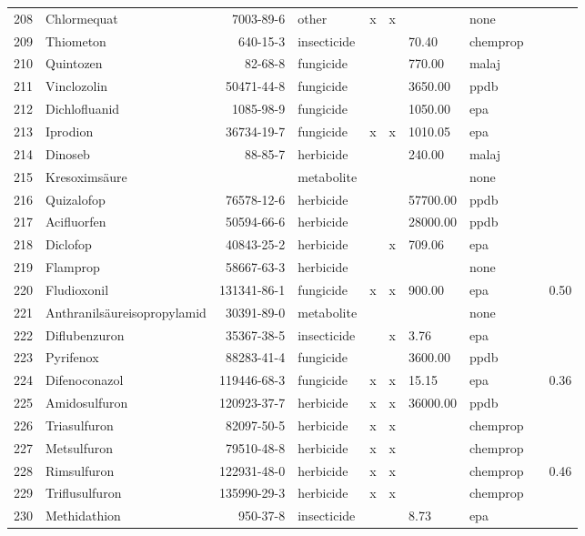 \begin{longtable}{lp{3cm}rlp{0.5cm}p{0.5cm}p{1.5cm}p{1cm}p{1cm}p{1cm}}
  208 & Chlormequat & 7003-89-6 & other & x & x &  & none &  &  \\ 
  209 & Thiometon & 640-15-3 & insecticide &  &  & 70.40 & chemprop &  &  \\ 
  210 & Quintozen & 82-68-8 & fungicide &  &  & 770.00 & malaj &  &  \\ 
  211 & Vinclozolin & 50471-44-8 & fungicide &  &  & 3650.00 & ppdb &  &  \\ 
  212 & Dichlofluanid & 1085-98-9 & fungicide &  &  & 1050.00 & epa &  &  \\ 
  213 & Iprodion & 36734-19-7 & fungicide & x & x & 1010.05 & epa &  &  \\ 
  214 & Dinoseb & 88-85-7 & herbicide &  &  & 240.00 & malaj &  &  \\ 
  215 & Kresoximsäure &  & metabolite &  &  &  & none &  &  \\ 
  216 & Quizalofop & 76578-12-6 & herbicide &  &  & 57700.00 & ppdb &  &  \\ 
  217 & Acifluorfen & 50594-66-6 & herbicide &  &  & 28000.00 & ppdb &  &  \\ 
  218 & Diclofop & 40843-25-2 & herbicide &  & x & 709.06 & epa &  &  \\ 
  219 & Flamprop & 58667-63-3 & herbicide &  &  &  & none &  &  \\ 
  220 & Fludioxonil & 131341-86-1 & fungicide & x & x & 900.00 & epa &  & 0.50 \\ 
  221 & Anthranilsäureisopropylamid & 30391-89-0 & metabolite &  &  &  & none &  &  \\ 
  222 & Diflubenzuron & 35367-38-5 & insecticide &  & x & 3.76 & epa &  &  \\ 
  223 & Pyrifenox & 88283-41-4 & fungicide &  &  & 3600.00 & ppdb &  &  \\ 
  224 & Difenoconazol & 119446-68-3 & fungicide & x & x & 15.15 & epa &  & 0.36 \\ 
  225 & Amidosulfuron & 120923-37-7 & herbicide & x & x & 36000.00 & ppdb &  &  \\ 
  226 & Triasulfuron & 82097-50-5 & herbicide & x & x &  & chemprop &  &  \\ 
  227 & Metsulfuron & 79510-48-8 & herbicide & x & x &  & chemprop &  &  \\ 
  228 & Rimsulfuron & 122931-48-0 & herbicide & x & x &  & chemprop &  & 0.46 \\ 
  229 & Triflusulfuron & 135990-29-3 & herbicide & x & x &  & chemprop &  &  \\ 
  230 & Methidathion & 950-37-8 & insecticide &  &  & 8.73 & epa &  &  \\ 

\end{longtable}
